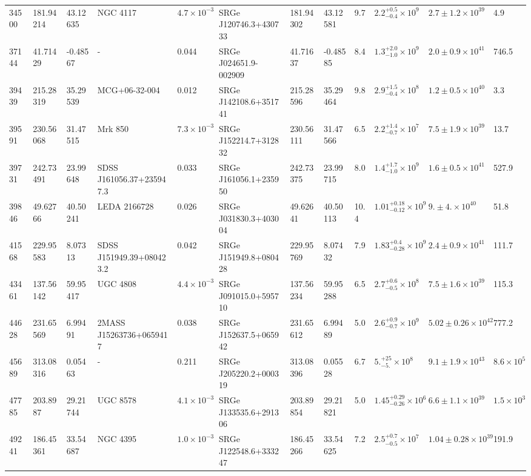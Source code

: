 \begin{longtable}{llllllllllll}
34500 & 181.94214 & 43.12635 & NGC  4117 & $4.7\times10^{-3}$ & SRGe J120746.3+430733 & 181.94302 & 43.12581 & 9.7 & $2.2^{+0.5}_{-0.4}\times10^{9}$ & $2.7\pm1.2\times10^{39}$ & 4.9 \\
37144 & 41.71429 & -0.48567 & - & 0.044 & SRGe J024651.9-002909 & 41.71637 & -0.48585 & 8.4 & $1.3^{+2.0}_{-1.0}\times10^{9}$ & $2.0\pm0.9\times10^{41}$ & 746.5 \\
39439 & 215.28319 & 35.29539 & MCG+06-32-004 & 0.012 & SRGe J142108.6+351741 & 215.28596 & 35.29464 & 9.8 & $2.9^{+1.5}_{-0.4}\times10^{8}$ & $1.2\pm0.5\times10^{40}$ & 3.3 \\
39591 & 230.56068 & 31.47515 & Mrk  850 & $7.3\times10^{-3}$ & SRGe J152214.7+312832 & 230.56111 & 31.47566 & 6.5 & $2.2^{+1.4}_{-0.7}\times10^{7}$ & $7.5\pm1.9\times10^{39}$ & 13.7 \\
39731 & 242.73491 & 23.99648 & SDSS J161056.37+235947.3 & 0.033 & SRGe J161056.1+235950 & 242.73375 & 23.99715 & 8.0 & $1.4^{+1.7}_{-1.0}\times10^{9}$ & $1.6\pm0.5\times10^{41}$ & 527.9 \\
39846 & 49.62766 & 40.50241 & LEDA 2166728 & 0.026 & SRGe J031830.3+403004 & 49.62641 & 40.50113 & 10.4 & $1.01^{+0.18}_{-0.12}\times10^{9}$ & $9.\pm4.\times10^{40}$ & 51.8 \\
41568 & 229.95583 & 8.07313 & SDSS J151949.39+080423.2 & 0.042 & SRGe J151949.8+080428 & 229.95769 & 8.07432 & 7.9 & $1.83^{+0.4}_{-0.28}\times10^{9}$ & $2.4\pm0.9\times10^{41}$ & 111.7 \\
43461 & 137.56142 & 59.95417 & UGC  4808 & $4.4\times10^{-3}$ & SRGe J091015.0+595710 & 137.56234 & 59.95288 & 6.5 & $2.7^{+0.6}_{-0.5}\times10^{8}$ & $7.5\pm1.6\times10^{39}$ & 115.3 \\
44628 & 231.65569 & 6.99491 & 2MASS J15263736+0659417 & 0.038 & SRGe J152637.5+065942 & 231.65612 & 6.99489 & 5.0 & $2.6^{+0.9}_{-0.7}\times10^{9}$ & $5.02\pm0.26\times10^{42}$ & 777.2 \\
45689 & 313.08316 & 0.05463 & - & 0.211 & SRGe J205220.2+000319 & 313.08396 & 0.05528 & 6.7 & $5.^{+25}_{-5.}\times10^{8}$ & $9.1\pm1.9\times10^{43}$ & $8.6\times10^{5}$ \\
47785 & 203.8987 & 29.21744 & UGC  8578 & $4.1\times10^{-3}$ & SRGe J133535.6+291306 & 203.89854 & 29.21821 & 5.0 & $1.45^{+0.29}_{-0.26}\times10^{6}$ & $6.6\pm1.1\times10^{39}$ & $1.5\times10^{3}$ \\
49241 & 186.45361 & 33.54687 & NGC  4395 & $1.0\times10^{-3}$ & SRGe J122548.6+333247 & 186.45266 & 33.54625 & 7.2 & $2.5^{+0.7}_{-0.5}\times10^{7}$ & $1.04\pm0.28\times10^{39}$ & 191.9 \\

\end{longtable}
